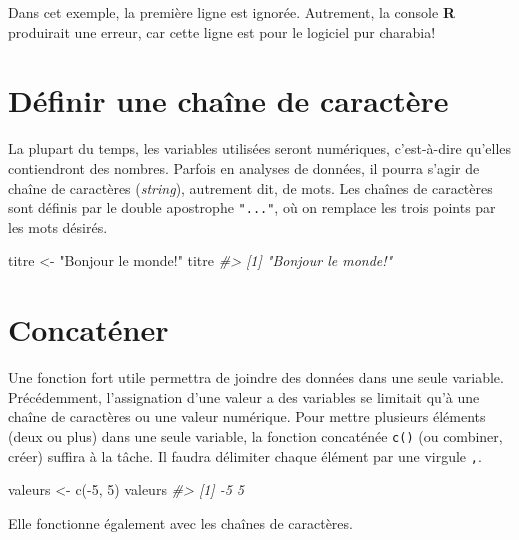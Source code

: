 \documentclass[
]{book}
\newenvironment{Shaded}{}{}
\newcommand{\CommentTok}[1]{\textit{#1}}
\newcommand{\DecValTok}[1]{#1}
\newcommand{\FunctionTok}[1]{#1}
\newcommand{\NormalTok}[1]{#1}
\newcommand{\OtherTok}[1]{#1}
\newcommand{\SpecialCharTok}[1]{#1}
\newcommand{\StringTok}[1]{#1}
\begin{document}
Dans cet exemple, la première ligne est ignorée. Autrement, la console \textbf{R} produirait une erreur, car cette ligne est pour le logiciel pur charabia!

\hypertarget{duxe9finir-une-chauxeene-de-caractuxe8re}{%
\section{Définir une chaîne de caractère}\label{duxe9finir-une-chauxeene-de-caractuxe8re}}

La plupart du temps, les variables utilisées seront numériques, c'est-à-dire qu'elles contiendront des nombres. Parfois en analyses de données, il pourra s'agir de chaîne de caractères (\emph{string}), autrement dit, de mots. Les chaînes de caractères sont définis par le double apostrophe \texttt{"..."}, où on remplace les trois points par les mots désirés.

\begin{Shaded}
\begin{Highlighting}[]
\NormalTok{titre }\OtherTok{\textless{}{-}} \StringTok{"Bonjour le monde!"}
\NormalTok{titre}
\CommentTok{\#\textgreater{} [1] "Bonjour le monde!"}
\end{Highlighting}
\end{Shaded}

\hypertarget{concatuxe9ner}{%
\section{Concaténer}\label{concatuxe9ner}}

Une fonction fort utile permettra de joindre des données dans une seule variable. Précédemment, l'assignation d'une valeur a des variables se limitait qu'à une chaîne de caractères ou une valeur numérique. Pour mettre plusieurs éléments (deux ou plus) dans une seule variable, la fonction concaténée \texttt{c()} (ou combiner, créer) suffira à la tâche. Il faudra délimiter chaque élément par une virgule \texttt{,}.

\begin{Shaded}
\begin{Highlighting}[]
\NormalTok{valeurs }\OtherTok{\textless{}{-}} \FunctionTok{c}\NormalTok{(}\SpecialCharTok{{-}}\DecValTok{5}\NormalTok{, }\DecValTok{5}\NormalTok{)}
\NormalTok{valeurs}
\CommentTok{\#\textgreater{} [1] {-}5  5}
\end{Highlighting}
\end{Shaded}

Elle fonctionne également avec les chaînes de caractères.
\end{document}
